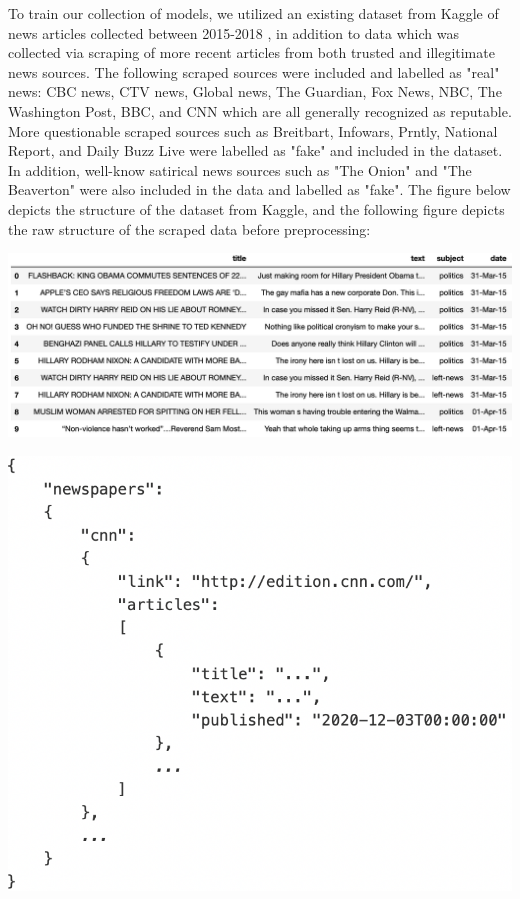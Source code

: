 \documentclass[10pt,twocolumn,letterpaper]{article}
\begin{document}
To train our collection of models, we utilized an existing dataset from Kaggle of news articles collected between 2015-2018 \cite{bisaillon_2020}, in addition to data which was collected via scraping of more recent articles from both trusted and illegitimate news sources. The following scraped sources were included and labelled as "real" news: CBC news, CTV news, Global news, The Guardian, Fox News, NBC, The Washington Post, BBC, and CNN which are all generally recognized as reputable. More questionable scraped sources such as Breitbart, Infowars, Prntly, National Report, and Daily Buzz Live were labelled as "fake" and included in the dataset. In addition, well-know satirical news sources such as "The Onion" and "The Beaverton" were also included in the data and labelled as "fake". The figure below depicts the structure of the dataset from Kaggle, and the following figure depicts the raw structure of the scraped data before preprocessing:
\begin{center}
\includegraphics[scale=0.3]{dt_example.png}
\end{center}
\begin{center}
\includegraphics[scale=0.4]{scraped_example.png}
\end{center}
\end{document}

